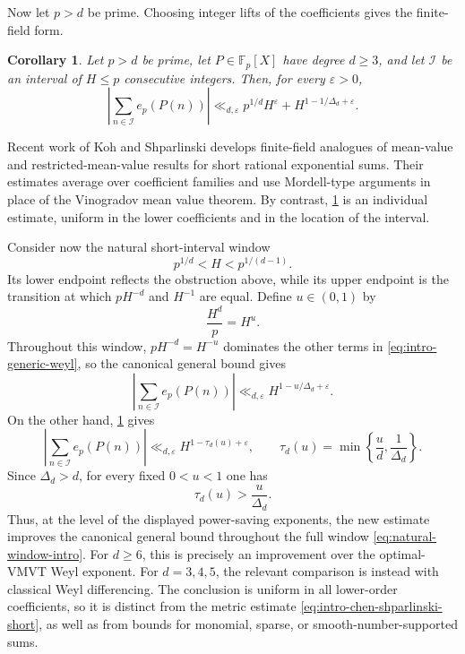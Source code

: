 \documentclass[11pt,reqno]{amsart}
\numberwithin{equation}{section}
\newtheorem{corollary}[corollary]{Corollary}
\theoremstyle{definition}
\theoremstyle{remark}
\begin{document}
Now let $p>d$ be prime.  Choosing integer lifts of the coefficients gives the
finite-field form.

\begin{corollary}\label{cor:prime-short-intro}
Let $p>d$ be prime, let $P\in\mathbb F_p[X]$ have degree $d\ge3$, and let
$\mathcal I$ be an interval of $H\le p$ consecutive integers.  Then, for
every $\varepsilon>0$,
\begin{equation}\label{eq:prime-short-intro}
  \left|\sum_{n\in\mathcal I}e_p(P(n))\right|
  \ll_{d,\varepsilon}
  p^{1/d}H^\varepsilon
  +H^{1-1/\Delta_d+\varepsilon}.
\end{equation}
\end{corollary}

Recent work of Koh and Shparlinski \cite{KohShparlinski2026} develops
finite-field analogues of mean-value and restricted-mean-value results for
short rational exponential sums.  Their estimates average over coefficient
families and use Mordell-type arguments in place of the Vinogradov mean value
theorem.  By contrast, \cref{cor:prime-short-intro} is an individual
estimate, uniform in the lower coefficients and in the location of the
interval.

Consider now the natural short-interval window
\begin{equation}\label{eq:natural-window-intro}
  p^{1/d}<H<p^{1/(d-1)}.
\end{equation}
Its lower endpoint reflects the obstruction above, while its upper endpoint
is the transition at which $pH^{-d}$ and $H^{-1}$ are equal.  Define
$u\in(0,1)$ by
\begin{equation}\label{eq:u-definition-intro}
  \frac{H^d}{p}=H^u.
\end{equation}
Throughout this window, $pH^{-d}=H^{-u}$ dominates the other terms in
\eqref{eq:intro-generic-weyl}, so the canonical general bound gives
\begin{equation}\label{eq:intro-generic-u}
  \left|\sum_{n\in\mathcal I}e_p(P(n))\right|
  \ll_{d,\varepsilon}
  H^{1-u/\Delta_d+\varepsilon}.
\end{equation}
On the other hand, \cref{cor:prime-short-intro} gives
\begin{equation}\label{eq:prime-u-intro}
  \left|\sum_{n\in\mathcal I}e_p(P(n))\right|
  \ll_{d,\varepsilon}
  H^{1-\tau_d(u)+\varepsilon},
  \qquad
  \tau_d(u)=\min\left\{\frac ud,\frac1{\Delta_d}\right\}.
\end{equation}
Since $\Delta_d>d$, for every fixed $0<u<1$ one has
\[
  \tau_d(u)>\frac{u}{\Delta_d}.
\]
Thus, at the level of the displayed power-saving exponents, the new estimate
improves the canonical general bound throughout the full window
\eqref{eq:natural-window-intro}.  For $d\ge6$, this is precisely an
improvement over the optimal-VMVT Weyl exponent.  For $d=3,4,5$, the relevant
comparison is instead with classical Weyl differencing.  The conclusion is
uniform in all lower-order coefficients, so it is distinct from the metric
estimate \eqref{eq:intro-chen-shparlinski-short}, as well as from bounds for
monomial, sparse, or smooth-number-supported sums.
\end{document}
